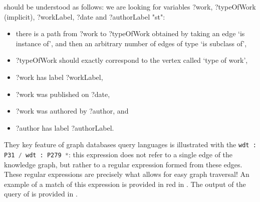 should be understood as follows:
we are looking for variables \textsf{?work}, \textsf{?typeOfWork} (implicit),
\textsf{?workLabel}, \textsf{?date} and \textsf{?authorLabel} "st":
\begin{itemize}
	\item there is a path from \textsf{?work} to \textsf{?typeOfWork}
		obtained by taking an edge `is instance of', and then an arbitrary number
		of edges of type `is subclass of',
	\item \textsf{?typeOfWork} should exactly correspond to the vertex called `type of work',
	\item \textsf{?work} has label \textsf{?workLabel}, 
	\item \textsf{?work} was published on \textsf{?date},
	\item \textsf{?work} was authored by \textsf{?author}, and
	\item \textsf{?author} has label \textsf{?authorLabel}.
\end{itemize}
They key feature of graph databases query languages is illustrated
with the \lstinline[language=SQL]{wdt : P31 / wdt : P279 *}:
this expression does not refer to a single edge of the knowledge graph,
but rather to a regular expression formed from these edges.
These regular expressions are precisely what allows for easy graph traversal!
An example of a match of this expression is provided
in red in .
The output of the query of 
is provided in .

